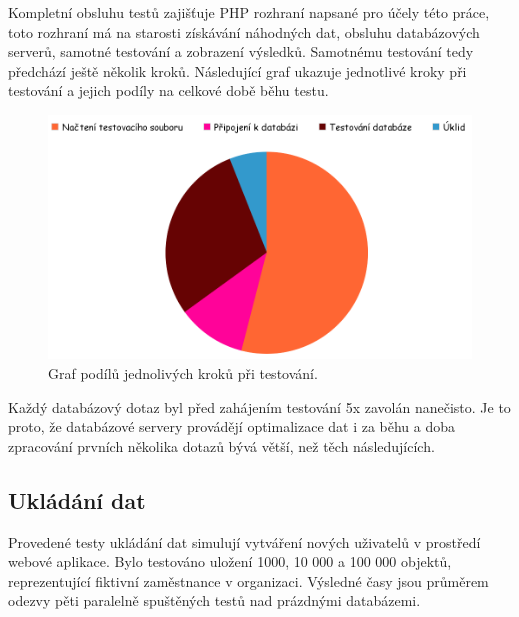 Kompletní obsluhu testů zajišťuje PHP rozhraní napsané pro účely této práce, toto rozhraní má na starosti získávání náhodných dat, obsluhu databázových serverů, samotné testování a zobrazení výsledků. Samotnému testování tedy předchází ještě několik kroků.
Následující graf ukazuje jednotlivé kroky při testování a jejich podíly na celkové době běhu testu.
\begin{figure}[h]
\begin{centering}
\includegraphics[scale=0.3]{obrazky/runtime-graf}
\par\end{centering}
\caption{Graf podílů jednolivých kroků při testování.\label{fig:runtimeGraph}}
\end{figure}
\FloatBarrier
Každý databázový dotaz byl před zahájením testování 5x zavolán nanečisto. Je to proto, že databázové servery provádějí optimalizace dat i za běhu a doba zpracování prvních několika dotazů bývá větší, než těch následujících.
\subsection{Ukládání dat}
Provedené testy ukládání dat simulují vytváření nových uživatelů v prostředí webové aplikace. Bylo testováno uložení 1000, 10 000 a 100 000 objektů, reprezentující fiktivní zaměstnance v organizaci. Výsledné časy jsou průměrem odezvy pěti paralelně spuštěných testů nad prázdnými databázemi.

